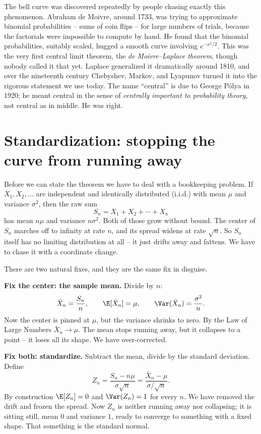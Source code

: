 \begin{historybox}
The bell curve was discovered repeatedly by people chasing exactly this phenomenon.
Abraham de Moivre, around 1733, was trying to approximate binomial probabilities --
sums of coin flips -- for large numbers of trials, because the factorials were
impossible to compute by hand. He found that the binomial probabilities, suitably
scaled, hugged a smooth curve involving $e^{-x^2/2}$. This was the very first central
limit theorem, the \emph{de Moivre--Laplace theorem}, though nobody called it that yet.
Laplace generalized it dramatically around 1810, and over the nineteenth century
Chebyshev, Markov, and Lyapunov turned it into the rigorous statement we use today.
The name ``central'' is due to George P\'olya in 1920; he meant central in the sense of
\emph{centrally important to probability theory}, not central as in middle. He was
right.
\end{historybox}

\section{Standardization: stopping the curve from running away}
\label{ch21:standardization}

Before we can state the theorem we have to deal with a bookkeeping problem. If
$X_1, X_2, \dots$ are independent and identically distributed (i.i.d.) with mean $\mu$
and variance $\sigma^2$, then the raw sum
\[
  S_n = X_1 + X_2 + \cdots + X_n
\]
has mean $n\mu$ and variance $n\sigma^2$. Both of those grow without bound. The center
of $S_n$ marches off to infinity at rate $n$, and its spread widens at rate $\sqrt{n}$.
So $S_n$ itself has no limiting distribution at all -- it just drifts away and fattens.
We have to chase it with a coordinate change.

There are two natural fixes, and they are the same fix in disguise.

\textbf{Fix the center: the sample mean.} Divide by $n$:
\[
  \bar X_n = \frac{S_n}{n}, \qquad \E[\bar X_n] = \mu, \qquad \Var(\bar X_n) = \frac{\sigma^2}{n}.
\]
Now the center is pinned at $\mu$, but the variance shrinks to zero. By the Law of Large
Numbers $\bar X_n \to \mu$. The mean stops running away, but it collapses to a point --
it loses all its shape. We have over-corrected.

\textbf{Fix both: standardize.} Subtract the mean, divide by the standard deviation.
Define
\[
  Z_n = \frac{S_n - n\mu}{\sigma\sqrt{n}}
      = \frac{\bar X_n - \mu}{\sigma/\sqrt{n}}.
\]
By construction $\E[Z_n] = 0$ and $\Var(Z_n) = 1$ for every $n$. We have removed the
drift and frozen the spread. Now $Z_n$ is neither running away nor collapsing; it is
sitting still, mean $0$ and variance $1$, ready to converge to something with a fixed
shape. That something is the standard normal.


